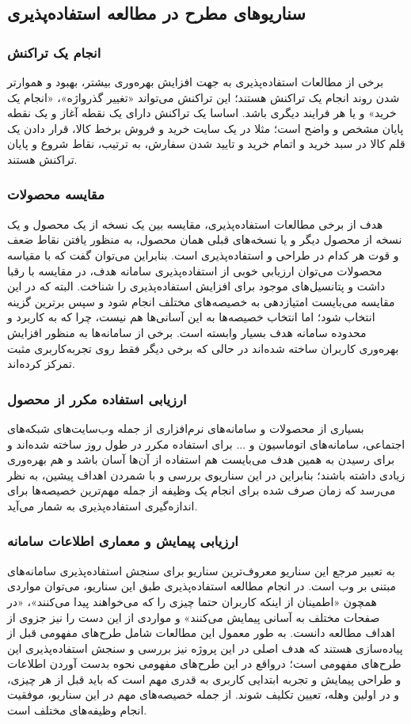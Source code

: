 \subsection{سناریو‌های مطرح در مطالعه استفاده‌پذیری}
\subsubsection{انجام یک تراکنش}
برخی از مطالعات استفاده‌پذیری به جهت افزایش بهره‌وری بیشتر، بهبود و هموارتر شدن روند انجام یک تراکنش هستند؛ این تراکنش می‌تواند «تغییر گذرواژه»، «انجام یک خرید» و یا هر فرایند دیگری باشد. اساسا یک تراکنش دارای یک نقطه آغاز و یک نقطه پایان مشخص و واضح است؛ مثلا در یک سایت خرید و فروش برخط کالا، قرار دادن یک قلم کالا در سبد خرید و اتمام خرید و تایید شدن سفارش، به ترتیب، نقاط شروع و پایان تراکنش هستند.
\subsubsection{مقایسه محصولات}
هدف از برخی مطالعات استفاده‌پذیری، مقایسه بین یک نسخه از یک محصول و یک نسخه از محصول دیگر و یا نسخه‌های قبلی همان محصول، به منظور یافتن نقاط ضعف و قوت هر کدام در طراحی و استفاده‌پذیری است. بنابراین می‌توان گفت که با مقیاسه محصولات می‌توان ارزیابی خوبی از استفاده‌پذیری سامانه هدف، در مقایسه با رقبا داشت و پتانسیل‌های موجود برای افزایش استفاده‌پذیری را شناخت. البته که در این مقایسه می‌بایست امتیازدهی به خصیصه‌های مختلف انجام شود و سپس برترین گزینه انتخاب شود؛ اما انتخاب خصیصه‌ها به این آسانی‌ها هم نیست، چرا که به کاربرد و محدوده سامانه هدف بسیار وابسته‌ است. برخی از سامانه‌ها به منظور افزایش بهره‌وری کاربران ساخته شده‌اند در حالی که برخی دیگر فقط روی تجربه‌کاربری مثبت تمرکز کرده‌اند.
\subsubsection{ارزیابی استفاده مکرر از محصول}
بسیاری از محصولات و سامانه‌های نرم‌افزاری از جمله وب‌سایت‌های شبکه‌های اجتماعی، سامانه‌های اتوماسیون و ... برای استفاده مکرر در طول روز ساخته شده‌اند و برای رسیدن به همین هدف می‌بایست هم استفاده از آن‌ها آسان باشد و هم بهره‌وری زیادی داشته باشند؛ بنابراین در این سناریوی بررسی و با شمردن اهداف پیشین، به نظر می‌رسد که زمان صرف شده برای انجام یک وظیفه از جمله مهم‌ترین خصیصه‌ها برای اندازه‌گیری استفاده‌پذیری به شمار می‌آید.
\subsubsection{ارزیابی پیمایش و معماری اطلاعات سامانه}
به تعبیر مرجع
\cite{albert_measuring_2013}
این سناریو معروف‌ترین سناریو برای سنجش استفاده‌پذیری سامانه‌های مبتنی بر وب است. در انجام مطالعه استفاده‌پذیری طبق این سناریو، می‌توان مواردی همچون «اطمینان از اینکه کاربران حتما چیزی را که می‌خواهند پیدا می‌کنند»، «در صفحات مختلف به آسانی پیمایش می‌کنند» و مواردی از این دست را نیز جزوی از اهداف مطالعه دانست. به طور معمول این مطالعات شامل طرح‌های مفهومی قبل از پیاده‌سازی هستند که هدف اصلی در این پروژه نیز بررسی و سنجش استفاده‌پذیری این طرح‌های مفهومی است؛ درواقع در این طرح‌های مفهومی نحوه بدست آوردن اطلاعات و طراحی پیمایش و تجربه ابتدایی کاربری به قدری مهم است که باید قبل از هر چیزی، و در اولین وهله، تعیین تکلیف شوند.
از جمله خصیصه‌های مهم در این سناریو، موفقیت انجام وظیفه‌های مختلف است.
